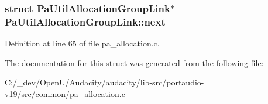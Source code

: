 \subsubsection[{\texorpdfstring{next}{next}}]{\setlength{\rightskip}{0pt plus 5cm}struct {\bf Pa\+Util\+Allocation\+Group\+Link}$\ast$ Pa\+Util\+Allocation\+Group\+Link\+::next}\hypertarget{struct_pa_util_allocation_group_link_a3b1739dedb3c039356364a3f2af239ec}{}\label{struct_pa_util_allocation_group_link_a3b1739dedb3c039356364a3f2af239ec}


Definition at line 65 of file pa\+\_\+allocation.\+c.



The documentation for this struct was generated from the following file\+:\begin{DoxyCompactItemize}
\item 
C\+:/\+\_\+dev/\+Open\+U/\+Audacity/audacity/lib-\/src/portaudio-\/v19/src/common/\hyperlink{pa__allocation_8c}{pa\+\_\+allocation.\+c}\end{DoxyCompactItemize}
